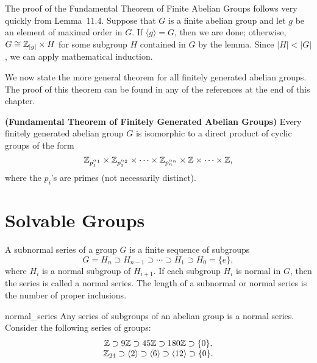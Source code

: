  
 
The proof of the Fundamental Theorem of Finite Abelian Groups follows
very quickly from Lemma~11.4.  Suppose that $G$ is a finite abelian
group and let $g$ be an element of maximal order in $G$. If $\langle g
\rangle = G$, then we are done; otherwise, $G \cong {\Bbb Z}_{|g|}
\times H$ for some subgroup $H$ contained in $G$ by the lemma.  Since
$|H| < |G|$, we can apply mathematical induction.  
 
 
We now state the more general theorem for all finitely generated
abelian groups.  The proof of this theorem can be found in any of the 
references at the end of this chapter.
 
 
\begin{theorem}
{\bf (Fundamental Theorem of Finitely Generated Abelian Groups)}
Every finitely generated abelian group $G$ is isomorphic to a direct
product of cyclic groups of the form 
\[
{\Bbb Z}_{p_1^{ \alpha_1 }}
\times
{\Bbb Z}_{p_2^{ \alpha_2 }}
\times
\cdots
\times
{\Bbb Z}_{p_n^{ \alpha_n }}
\times
{\Bbb Z}
\times \cdots \times
{\Bbb Z},
\]
where the $p_i$'s are primes (not necessarily distinct).
\end{theorem}
 
 
 
\section{Solvable Groups}
 
 
 
A {\bfi subnormal series\/} 
of a group $G$ is a finite sequence of subgroups 
\[
G = H_n \supset H_{n-1} \supset \cdots \supset H_1 \supset
H_0 = \{ e \},
\]
where $H_i$ is a normal subgroup of $H_{i+1}$. If each subgroup $H_i$
is normal in $G$, then the series is called a {\bfi normal
series}. The {\bfi length\/} of a 
subnormal or normal series is the number of proper inclusions. 
 
 
 
\begin{example}{normal_series}
Any series of subgroups of an abelian group is a normal series.
Consider the following  series of groups: 
\[
\begin{array}{c}
{\Bbb Z} \supset 9{\Bbb Z} \supset 45{\Bbb Z} \supset 180{\Bbb Z} 
\supset \{0\}, \\
{\Bbb Z}_{24} \supset \langle 2 \rangle \supset \langle 6 \rangle 
\supset \langle 12 \rangle
\supset \{0\}.
\end{array}
\]
\end{example}
 
